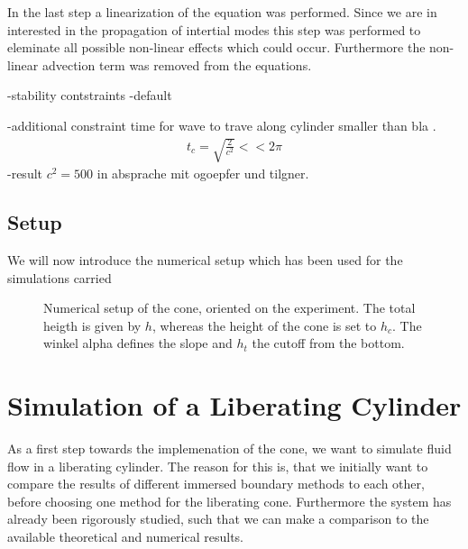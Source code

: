 In the last step a linearization of the equation was performed.
Since we are in interested in the propagation of intertial modes this
step was performed to eleminate all possible non-linear effects which could occur.
Furthermore the non-linear advection term was removed from the equations.

-stability contstraints
-default

-additional constraint time for wave to trave along cylinder smaller than bla \citep{TILGNER, OGOEPFERT}.
\begin{align}
    t_{c} = \sqrt{\frac{2}{c^2}} << 2\pi
\end{align}
-result $c^2 = 500$ in absprache mit ogoepfer und tilgner.



\newpage

\subsection{Setup}

We will now introduce the numerical setup which has been used for the simulations carried



\begin{figure}[!bp]
  \begin{minipage}[c]{0.6\textwidth}
      \centering
  \end{minipage}
  \begin{minipage}[c]{0.3\textwidth}
      \caption{Numerical setup of the cone, oriented on the experiment. The total heigth is given by $h$, whereas the height of the cone is set to $h_c$.
      The winkel alpha defines the slope and $h_t$ the cutoff from the bottom.}
      \label{cone:setxp_image}
  \end{minipage}
\end{figure}

\clearpage

\section{Simulation of a Liberating Cylinder}
\label{cone:sec:lib_cylinder}


As a first step towards the implemenation of the cone,
we want to simulate fluid flow in a liberating cylinder.
The reason for this is, that we initially want to
compare the results of different immersed boundary methods to each other,
before choosing one method for the liberating cone.
Furthermore the system has already been rigorously studied, such that
we can make a comparison to the available theoretical and numerical results.\\


